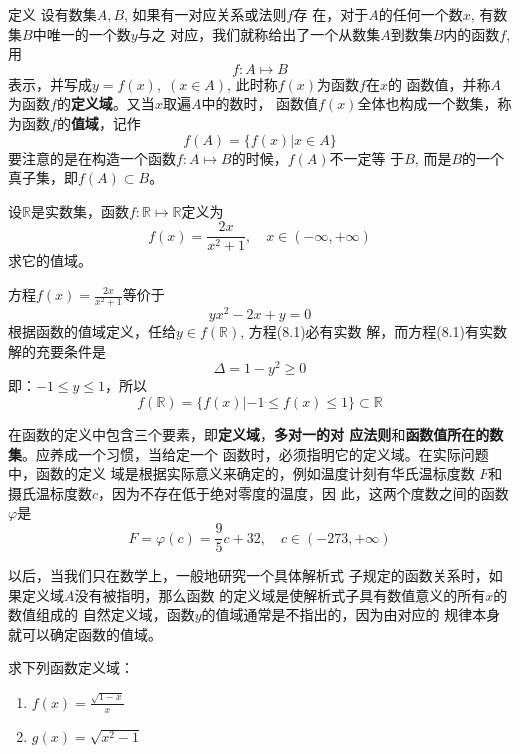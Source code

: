 \begin{blk}{定义}
     设有数集$A,B$, 如果有一对应关系或法则$f$存
在，对于$A$的任何一个数$x$, 有数集$B$中唯一的一个数$y$与之
对应，我们就称给出了一个从数集$A$到数集$B$内的函数$f$, 用
\[f:A\mapsto B\]
表示，并写成$y=f(x),\; (x\in A)$, 此时称$f(x)$为函数$f$在$x$的
函数值，并称$A$为函数$f$的\textbf{定义域}。又当$x$取遍$A$中的数时，
函数值$f(x)$全体也构成一个数集，称为函数$f$的\textbf{值域}，记作
\[f(A)=\{f(x)|x\in A\}\]
要注意的是在构造一个函数$f:A\mapsto B$的时候，$f(A)$不一定等
于$B$, 而是$B$的一个真子集，即$f(A)\subset B$。
\end{blk}



\begin{example}
设$\mathbb{R}$是实数集，函数$f:\mathbb{R}\mapsto\mathbb{R}$定义为
\[f(x)=\frac{2x}{x^2+1},\quad x\in(-\infty,+\infty)\]
求它的值域。
\end{example}

\begin{solution}
    方程$f(x)=\frac{2x}{x^2+1}$等价于
    \begin{equation}
        yx^2-2x+y=0
    \end{equation}
根据函数的值域定义，任给$y\in f(\mathbb{R})$, 方程(8.1)必有实数
解，而方程(8.1)有实数解的充要条件是
\[\Delta=1-y^2\ge 0\]
即：$-1\le y\le 1$，所以
\[f(\mathbb{R})=\{f(x)|-1\le f(x)\le 1\}\subset \mathbb{R}\]
\end{solution}

在函数的定义中包含三个要素，即\textbf{定义域}，\textbf{多对一的对
应法则}和\textbf{函数值所在的数集}。应养成一个习惯，当给定一个
函数时，必须指明它的定义域。在实际问题中，函数的定义
域是根据实际意义来确定的，例如温度计刻有华氏温标度数
$F$和摄氏温标度数$c$，因为不存在低于绝对零度的温度，因
此，这两个度数之间的函数$\varphi$是
\[F=\varphi(c)=\frac{9}{5}c+32,\quad c\in (-273,+\infty)\]

以后，当我们只在数学上，一般地研究一个具体解析式
子规定的函数关系时，如果定义域$A$没有被指明，那么函数
的定义域是使解析式子具有数值意义的所有$x$的数值组成的
自然定义域，函数$y$的值域通常是不指出的，因为由对应的
规律本身就可以确定函数的值域。


\begin{example}
    求下列函数定义域：
\begin{multicols}{2}
\begin{enumerate}
    \item $f(x)=\frac{\sqrt{1-x}}{x}$
    \item $g(x)=\sqrt{x^2-1}$
\end{enumerate}
\end{multicols}
\end{example}


